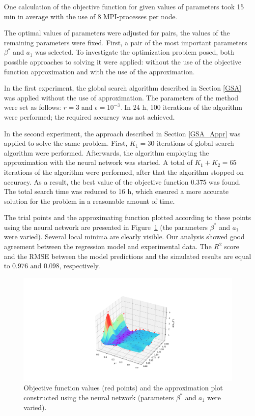 \documentclass[mathematics,article,accept,pdftex,moreauthors]{Definitions/mdpi}
\begin{document}
One calculation of the objective function for given values of parameters took 15 min in average with the use of 8 MPI-processes per node. 

The optimal values of parameters were adjusted for pairs, the values of the remaining parameters were fixed. 
First, a pair of the most important parameters $\beta^*$ and $a_1$ was selected. 
To investigate the optimization problem posed, both possible approaches to solving it were applied: without the use of the objective function approximation  and with the use of the approximation.

In the first experiment, the global search algorithm described in Section \ref{GSA} was applied without the use of approximation. 
The parameters of the method were set as follows: $r = 3$ and $\epsilon = 10^{-3}$. 
In 24 h, 100 iterations of the algorithm were performed; the required accuracy was not achieved. 

In the second experiment, the approach described in Section \ref{GSA_Appr} was applied to solve the same problem.
First, $K_1 = 30$ iterations of global search algorithm were performed. 
Afterwards, the algorithm employing the approximation with the neural network was started. 
A total of $K_1 + K_2 = 65$ iterations of the algorithm were performed, after that the algorithm stopped on accuracy. 
As a result, the best value  of the objective function 0.375 was found. 
The total search time was reduced to 16 h, which ensured a more accurate solution for the problem in a reasonable amount of time.

The trial points and the approximating function plotted according to these points using the neural network are presented in Figure~\ref{NN_100_point} (the parameters $\beta^*$ and $a_1$ were varied). Several local minima are clearly visible.
Our analysis showed good agreement between the regression model and experimental data.
The $R^2$ score and the RMSE between the model predictions and the simulated results are equal to 0.976 and 0.098, respectively.


\begin{figure}[H]
 
\includegraphics[width=0.6\linewidth]{NN_100_point_.pdf}
\caption{Objective 
function values (red points) and the approximation plot constructed using the neural network (parameters $\beta^*$ and $a_1$ were varied).\label{NN_100_point}}
 
\end{figure}   
 
\end{document}
